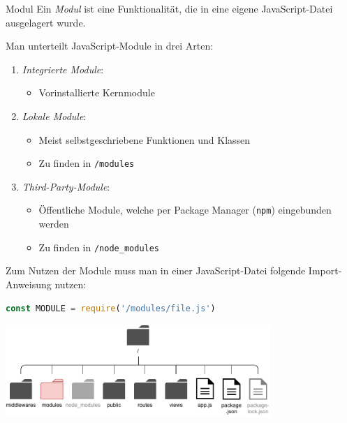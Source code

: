 \begin{defi}{Modul}
    Ein \emph{Modul} ist eine Funktionalität, die in eine eigene JavaScript-Datei ausgelagert wurde.

    Man unterteilt JavaScript-Module in drei Arten:
    \begin{enumerate}
        \item \emph{Integrierte Module}:
              \begin{itemize}
                  \item Vorinstallierte Kernmodule
              \end{itemize}
        \item \emph{Lokale Module}:
              \begin{itemize}
                  \item Meist selbstgeschriebene Funktionen und Klassen
                  \item Zu finden in \texttt{/modules}
              \end{itemize}
        \item \emph{Third-Party-Module}:
              \begin{itemize}
                  \item Öffentliche Module, welche per Package Manager (\texttt{npm}) eingebunden werden
                  \item Zu finden in \texttt{/node\_modules}
              \end{itemize}
    \end{enumerate}

    Zum Nutzen der Module muss man in einer JavaScript-Datei folgende Import-Anweisung nutzen:
    \begin{lstlisting}[language=JavaScript]
        const MODULE = require('/modules/file.js')
    \end{lstlisting}
\end{defi}

\begin{center}
    \includegraphics[width=0.75\textwidth]{includes/figures/bonus_nodejs_module.pdf}
\end{center}

